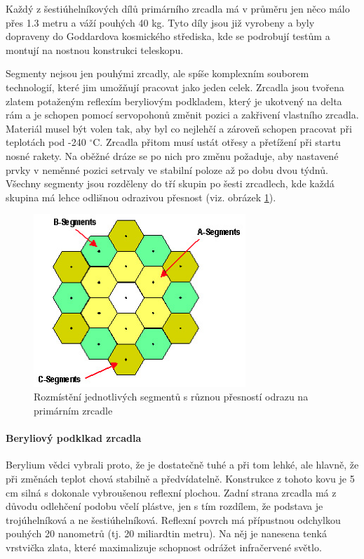 \documentclass[a4paper,11pt]{article}
\begin{document}
Každý z šestiúhelníkových dílů primárního zrcadla má v průměru jen něco málo přes 1.3 metru a váží pouhých 40 kg. Tyto díly jsou již vyrobeny a byly dopraveny do Goddardova kosmického střediska, kde se podrobují testům a montují na nostnou konstrukci teleskopu.

Segmenty nejsou jen pouhými zrcadly, ale spíše komplexním souborem technologií, které jim umožňují pracovat jako jeden celek. Zrcadla jsou tvořena zlatem potaženým reflexím beryliovým podkladem, který je ukotvený na delta rám a je schopen pomocí servopohonů změnit pozici a zakřivení vlastního zrcadla. Materiál musel být volen tak, aby byl co nejlehčí a zároveň schopen pracovat při teplotách pod -240 $^\circ$C. Zrcadla přitom musí ustát otřesy a přetížení při startu nosné rakety. Na oběžné dráze se po nich pro změnu požaduje, aby nastavené prvky v neměnné pozici setrvaly ve stabilní poloze až po dobu dvou týdnů. Všechny segmenty jsou rozděleny do tří skupin po šesti zrcadlech, kde každá skupina má lehce odlišnou odrazivou přesnost (viz. obrázek \ref{segmenty}). 

\begin{figure}[h]
\begin{center}
\includegraphics[width=8cm]{webbSegmenty.eps}
\caption{Rozmístění jednotlivých segmentů s různou přesností odrazu na primárním zrcadle}
\label{segmenty}
\end{center}
\end{figure}

\paragraph{Beryliový podklkad zrcadla}
Berylium vědci vybrali proto, že je dostatečně tuhé a při tom lehké, ale hlavně, že při změnách teplot chová stabilně a předvídatelně. Konstrukce z tohoto kovu je 5 cm silná s dokonale vybroušenou reflexní plochou. Zadní strana zrcadla má z důvodu odlehčení podobu včelí plástve, jen s tím rozdílem, že podstava je trojúhelníková a ne šestiúhelníková.
Reflexní povrch má přípustnou odchylkou pouhých 20 nanometrů (tj. 20 miliardtin metru). Na něj je nanesena tenká vrstvička zlata, které maximalizuje schopnost odrážet infračervené světlo. 
\end{document}
